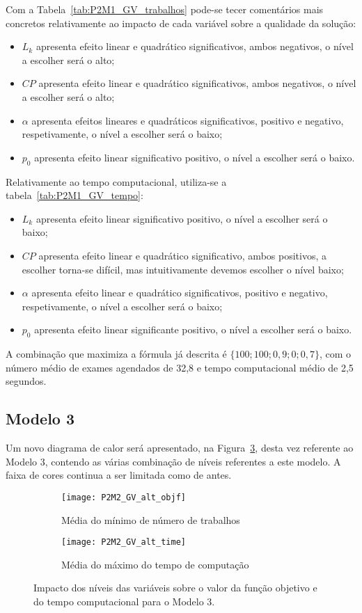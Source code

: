 Com a Tabela~\ref{tab:P2M1_GV_trabalhos} pode-se tecer comentários mais concretos relativamente ao impacto de cada variável sobre a qualidade da solução:
\begin{itemize}
\item $L_{k}$ apresenta efeito linear e quadrático significativos, ambos negativos, o nível a escolher será o alto;
\item $CP$ apresenta efeito linear e quadrático significativos, ambos negativos, o nível a escolher será o alto;
\item $\alpha$ apresenta efeitos lineares e quadráticos significativos, positivo e negativo, respetivamente, o nível a escolher será o baixo;
\item $p_{0}$ apresenta efeito linear significativo positivo, o nível a escolher será o baixo.
\end{itemize}
Relativamente ao tempo computacional, utiliza-se a tabela~\ref{tab:P2M1_GV_tempo}:
\begin{itemize}
\item $L_{k}$ apresenta efeito linear significativo positivo, o nível a escolher será o baixo;
\item $CP$ apresenta efeito linear e quadrático significativo, ambos positivos, a escolher torna-se difícil, mas intuitivamente devemos escolher o nível baixo;
\item $\alpha$ apresenta efeito linear e quadrático significativos, positivo e negativo, respetivamente, o nível a escolher será o baixo;
\item $p_{0}$ apresenta efeito linear significante positivo, o nível a escolher será o baixo.
\end{itemize}

A combinação que maximiza a fórmula já descrita é $\{100; 100; 0,9; 0; 0,7\}$, com o número médio de exames agendados de 32,8 e tempo computacional médio de 2,5 segundos.\\

\subsection{Modelo 3}

Um novo diagrama de calor será apresentado, na Figura~\ref{fig:P2M2_GV_alt}, desta vez referente ao Modelo 3, contendo as várias combinação de níveis referentes a este modelo. A faixa de cores continua a ser limitada como de antes.

\begin{figure}[h]
	\centering
	\begin{subfigure}{0.49\textwidth}
	\centering
		\texttt{[image: P2M2\_GV\_alt\_objf]}
		\caption{Média do mínimo de número de trabalhos}
		\label{fig:P2M2_GV_alt_objf}
	\end{subfigure}
	\begin{subfigure}{0.49\textwidth}
	\centering
		\texttt{[image: P2M2\_GV\_alt\_time]}
		\caption{Média do máximo do tempo de computação}
		\label{fig:P2M2_GV_alt_time}
	\end{subfigure}
	\caption{Impacto dos níveis das variáveis sobre o valor da função objetivo e do tempo computacional para o Modelo 3.}
	\label{fig:P2M2_GV_alt}
\end{figure}

